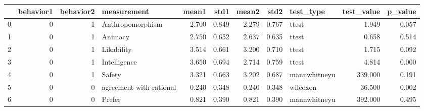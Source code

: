 \begin{tabular}{lrrlrrrrlrr}
\toprule
{} &  behavior1 &  behavior2 &              measurement &  mean1 &   std1 &  mean2 &   std2 &     test\_type &  test\_value &  p\_value \\
\midrule
0 &          0 &          1 &         Anthropomorphism &  2.700 &  0.849 &  2.279 &  0.767 &         ttest &       1.949 &    0.057 \\
1 &          0 &          1 &                  Animacy &  2.750 &  0.652 &  2.637 &  0.635 &         ttest &       0.658 &    0.514 \\
2 &          0 &          1 &               Likability &  3.514 &  0.661 &  3.200 &  0.710 &         ttest &       1.715 &    0.092 \\
3 &          0 &          1 &             Intelligence &  3.650 &  0.694 &  2.714 &  0.759 &         ttest &       4.814 &    0.000 \\
4 &          0 &          1 &                   Safety &  3.321 &  0.663 &  3.202 &  0.687 &  mannwhitneyu &     339.000 &    0.191 \\
5 &          0 &          0 &  agreement with rational &  0.240 &  0.348 &  0.240 &  0.348 &      wilcoxon &      36.500 &    0.002 \\
6 &          0 &          0 &                   Prefer &  0.821 &  0.390 &  0.821 &  0.390 &  mannwhitneyu &     392.000 &    0.495 \\
\bottomrule
\end{tabular}

